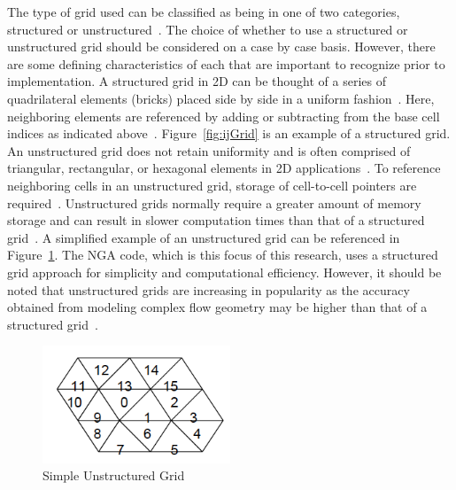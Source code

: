 The type of grid used can be classified as being in one of two categories, structured or unstructured~\cite{anderson}. The choice of whether to use a structured or unstructured grid should be considered on a case by case basis. However, there are some defining characteristics of each that are important to recognize prior to implementation. A structured grid in 2D can be thought of a series of quadrilateral elements (bricks) placed side by side in a uniform fashion~\cite{MIT}. Here, neighboring elements are referenced by adding or subtracting from the base cell indices as indicated above~\cite{anderson}. Figure~\ref{fig:ijGrid} is an example of a structured grid. An unstructured grid does not retain uniformity and is often comprised of triangular, rectangular, or hexagonal elements in 2D applications~\cite{tu}. To reference neighboring cells in an unstructured grid, storage of cell-to-cell pointers are required~\cite{MIT}. Unstructured grids normally require a greater amount of memory storage and can result in slower computation times than that of a structured grid~\cite{magoules}. A simplified example of an unstructured grid can be referenced in Figure~\ref{fig:Unstructured Grid}. The NGA code, which is this focus of this research, uses a structured grid approach for simplicity and computational efficiency. However, it should be noted that unstructured grids are increasing in popularity as the accuracy obtained from modeling complex flow geometry may be higher than that of a structured grid~\cite{Hirt1981}. 

\begin{figure}[htbp]
	\centering
	\includegraphics[width=0.5\textwidth]{figs/unstruc}
	\caption{Simple Unstructured Grid \cite{MIT}}
	\label{fig:Unstructured Grid}
\end{figure}

